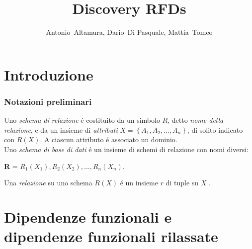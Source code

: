 \documentclass[11pt]{article}
\begin{document}
\title{Discovery RFDs}

\author{Antonio~Altamura,
		Dario~Di Pasquale,
   	Mattia~Tomeo}%
   	
 
\maketitle
\section{Introduzione}
\subsubsection{Notazioni preliminari}
Uno \textit{schema di relazione} \'e costituito da un simbolo $R$, detto \textit{nome della relazione}, e da un insieme di \textit{attributi} $X = \left\{ A_1, A_2,\ldots, A_n \right\}$, di solito indicato con $R(X)$. A ciascun attributo \'e associato un dominio. \\
Uno \textit{schema di base di dati} \'e un insieme di schemi di relazione con nomi diversi:
\begin{center}
	\textbf{R} = $R_1(X_1), R_2(X_2), \ldots, R_n(X_n)$.
\end{center}
Una \textit{relazione} su uno schema $R(X)$ \'e un insieme $r$ di tuple su $X$ \cite{atzeni1999basi}.
\section{Dipendenze funzionali e dipendenze funzionali rilassate}
\end{document}
